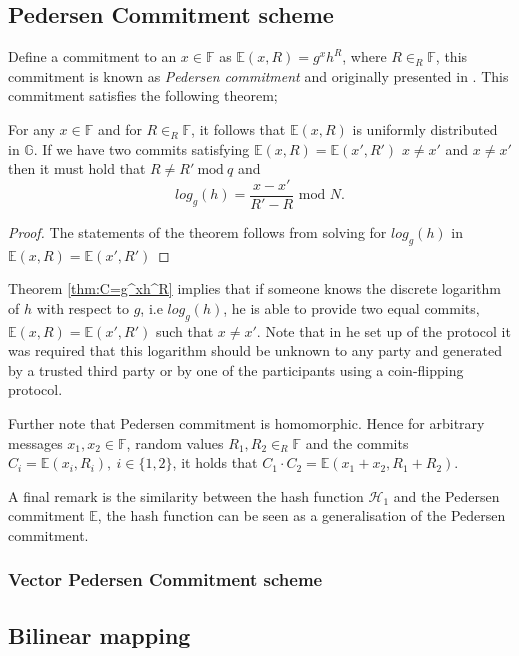 \subsection*{Pedersen Commitment scheme}
Define a commitment to an $x\in\mathds{F}$ as $\mathds{E}(x,R)=g^xh^R$, where $R\in_R\mathds{F}$, this commitment is known as \textit{Pedersen commitment} and originally presented in \cite{pedersen}. This commitment satisfies the following theorem;
\\
\begin{thm}
\label{thm:C=g^xh^R}
For any $x\in\mathds{F}$ and for $R\in_R\mathds{F}$, it follows that   $\mathds{E}(x,R)$ is uniformly distributed in $\mathds{G}$. If we have two commits satisfying $\mathds{E}(x,R)=\mathds{E}(x',R')$  $x\neq x'$ and  $x\neq x'$ then it must hold that $R\neq R' \:\text{mod}\:q$ and 
\begin{equation*}
    log_g(h) = \frac{x-x'}{R'-R} \text{ mod }N.
\end{equation*}
\end{thm}
\begin{proof}
The statements of the theorem follows from solving for $log_g(h)$ in $\mathds{E}(x,R)=\mathds{E}(x',R')$ 
\end{proof}

Theorem \ref{thm:C=g^xh^R} implies that if someone knows the discrete logarithm of $h$ with respect to $g$, i.e $log_g(h)$, he is able to provide two equal commits, $\mathds{E}(x,R)=\mathds{E}(x',R')$ such that $x\neq x'$. Note that in he set up of the protocol it was required that this logarithm should be unknown to any party and generated by a trusted third party or by one of the participants using a coin-flipping protocol.

Further note that Pedersen commitment is homomorphic. Hence for arbitrary messages $x_1,x_2\in\mathds{F}$, random values $R_1,R_2\in_R\mathds{F}$ and the commits $C_i=\mathds{E}(x_i,R_i),\:i\in\{1,2\}$, it holds that $C_1\cdot C_2 = \mathds{E}(x_1+x_2,R_1+R_2)$.

A final remark is the similarity between the hash function $\mathcal{H}_1$ and the Pedersen commitment $\mathds{E}$, the hash function can be seen as a generalisation of the Pedersen commitment. 

\subsubsection*{Vector Pedersen Commitment scheme}
\subsection*{Bilinear mapping}
\label{sec:bilinear}


